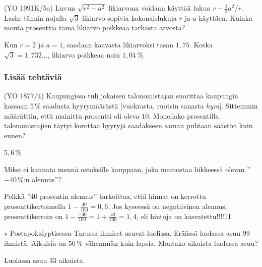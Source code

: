 \begin{tehtavasivu}
\begin{tehtava}
    (YO 1991K/5a) Luvun $\sqrt{r^2-a^2}$ likiarvona voidaan käyttää lukua $r-{\frac{1}{2}a^2}/r$. Laske tämän nojalla $\sqrt{3}$ likiarvo sopivia kokonaislukuja $r$ ja $a$ käyttäen. Kuinka monta prosenttia tämä likiarvo poikkeaa tarkasta arvosta?
    \begin{vastaus}
    Kun $r=2$ ja $a=1$, saadaan kaavasta likiarvoksi tasan $1,75$. Koska $\sqrt{3}=1,732\ldots$, likiarvo poikkeaa noin $1,04\,\%$.
    \end{vastaus}
\end{tehtava}

\subsubsection*{Lisää tehtäviä}


\begin{tehtava}
    (YO 1877/4) Kaupungissa tuli jokaisen talonomistajan suorittaa kaupungin kassaan $5\,\%$ saadusta hyyrymäärästä [vuokrasta, ruotsin sanasta \textit{hyra}]. Sittemmin määrättiin, että mainittu prosentti oli oleva $10$. Monellako prosentilla talonomistajien täytyi korottaa hyyryjä saadakseen saman puhtaan säästön kuin ennen?
    \begin{vastaus}
        $5,6\,\%$
    \end{vastaus}
\end{tehtava}
	
\begin{tehtava}
Miksi ei kannata mennä ostoksille kauppaan, joka mainostaa liikkeessä olevan ''$-40$\,\%:n alennus''?
	\begin{vastaus}
	Pelkkä ''$40$ prosentin alennus'' tarkoittaa, että hinnat on kerrottu prosenttikertoimella $1-\frac{40}{100}=0,6$. Jos kyseessä on negatiivinen alennus, prosenttikerroin on $1-\frac{-40}{100}=1+\frac{40}{100}=1,4$, eli hintoja on kasvatettu!!!!11
	\end{vastaus}
\end{tehtava}

\begin{tehtava} 
		$\star$ Postapokalyptisessa Turussa ihmiset asuvat luolissa. Eräässä luolassa asuu $99$ ihmistä. Aikuisia on $50\,\%$ vähemmän kuin lapsia. Montako aikuista luolassa asuu?
	\begin{vastaus}
	Luolassa asuu $33$ aikuista.
	\end{vastaus}
\end{tehtava} %

\end{tehtavasivu}